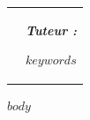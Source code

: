 \documentclass[a4paper,12pt]{article}
\begin{document}
\begin{titlepage}
\begin{center}
\begin{tabularx}{0.90\textwidth}{>{\raggedright\arraybackslash}X >{\raggedleft\arraybackslash}X}
\begin{flushleft}
\end{flushleft}

&


\begin{flushright}

\textit{\textbf{Tuteur :}}

\vspace{0.15cm}

\textsc{$keywords$}

\end{flushright}

\end{tabularx}

\end{center}

\vspace{1.3cm}

\end{titlepage}


\clearpage

\pagestyle{fancy}

\renewcommand{\contentsname}{Table des matières}

\tableofcontents


\clearpage

$body$
\end{document}
